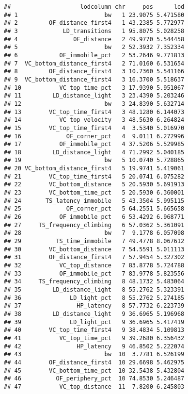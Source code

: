 \documentclass[oneside]{book}
\begin{document}
\begin{verbatim}
##                    lodcolumn chr     pos      lod
## 1                         bw   1 23.9075 5.471580
## 2         OF_distance_first4   1 43.2385 5.772977
## 3             LD_transitions   1 95.8075 5.028258
## 4                OF_distance   2 49.9770 5.544458
## 5                         bw   2 52.3932 7.352334
## 6            OF_immobile_pct   2 53.2646 9.771813
## 7  VC_bottom_distance_first4   2 71.0160 6.531654
## 8         OF_distance_first4   3 10.7360 5.541166
## 9  VC_bottom_distance_first4   3 16.3700 5.518637
## 10           VC_top_time_pct   3 17.9390 5.951067
## 11         LD_distance_light   3 23.4390 5.203246
## 12                        bw   3 24.8390 5.632714
## 13        VC_top_time_first4   3 48.1280 6.144073
## 14           VC_top_velocity   3 48.5630 6.264824
## 15        VC_top_time_first4   4  3.5340 5.016970
## 16             OF_corner_pct   4  9.0111 6.272996
## 17           OF_immobile_pct   4 37.5206 5.529985
## 18         LD_distance_light   4 71.2992 5.040185
## 19                        bw   5 10.0740 5.728865
## 20 VC_bottom_distance_first4   5 19.9741 5.419061
## 21        VC_top_time_first4   5 20.0741 6.075282
## 22        VC_bottom_distance   5 20.5930 5.691913
## 23        VC_bottom_time_pct   5 20.5930 6.360001
## 24       TS_latency_immobile   5 43.3504 5.995115
## 25             OF_corner_pct   5 64.2551 5.665658
## 26           OF_immobile_pct   6 53.4292 6.968771
## 27     TS_frequency_climbing   6 57.0362 5.361091
## 28                        bw   7  9.1778 6.057098
## 29          TS_time_immobile   7 49.4778 8.067612
## 30        VC_bottom_distance   7 54.5591 5.011113
## 31        OF_distance_first4   7 57.9454 5.327302
## 32           VC_top_distance   7 83.8778 5.724788
## 33           OF_immobile_pct   7 83.9778 5.823556
## 34     TS_frequency_climbing   8 48.1732 5.483064
## 35         LD_distance_light   8 55.2762 5.323391
## 36              LD_light_pct   8 55.2762 5.274185
## 37                HP_latency   8 57.7732 6.223739
## 38         LD_distance_light   9 36.6965 5.196968
## 39              LD_light_pct   9 36.6965 5.417419
## 40        VC_top_time_first4   9 38.4834 5.109813
## 41           VC_top_time_pct   9 39.2680 6.356432
## 42                HP_latency   9 46.8502 5.222074
## 43                        bw  10  3.7781 6.526199
## 44        OF_distance_first4  10 29.6698 5.462975
## 45        VC_bottom_time_pct  10 32.5438 5.432804
## 46          OF_periphery_pct  10 74.8530 5.246487
## 47           VC_top_distance  11  7.8200 6.245803

\end{verbatim}
\end{document}
